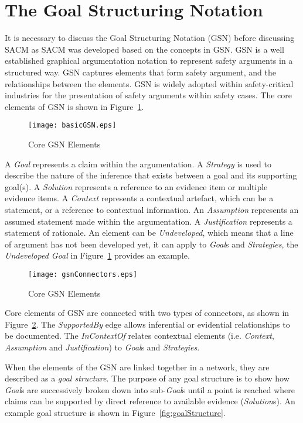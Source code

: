 \section{The Goal Structuring Notation}
\label{gsn}
It is necessary to discuss the Goal Structuring Notation (GSN) before discussing SACM as SACM was developed based on the concepts in GSN. GSN is a well established graphical argumentation notation to represent safety arguments in a structured way. GSN captures elements that form safety argument, and the relationships between the elements. GSN is widely adopted within safety-critical industries for the presentation of safety arguments within safety cases. The core elements of GSN is shown in Figure~\ref{fig:gsnCore}.

\begin{figure}
	\centering
	\texttt{[image: basicGSN.eps]}
	\caption{Core GSN Elements}
	\label{fig:gsnCore}
\end{figure}

A \textit{Goal} represents a claim within the argumentation. A \textit{Strategy} is used to describe the nature of the inference that exists between a goal and its supporting goal(s). A \textit{Solution} represents a reference to an evidence item or multiple evidence items. A \textit{Context} represents a contextual artefact, which can be a statement, or a reference to contextual information. An \textit{Assumption} represents an assumed statement made within the argumentation. A \textit{Justification} represents a statement of rationale. An element can be \textit{Undeveloped}, which means that a line of argument has not been developed yet, it can apply to \textit{Goal}s and \textit{Strategies}, the \textit{Undeveloped Goal} in Figure~\ref{fig:gsnCore} provides an example. 

\begin{figure}
	\centering
	\texttt{[image: gsnConnectors.eps]}
	\caption{Core GSN Elements}
	\label{fig:gsnEdges}
\end{figure}

Core elements of GSN are connected with two types of connectors, as shown in Figure~\ref{fig:gsnEdges}. The \textit{SupportedBy} edge allows inferential or evidential relationships to be documented. The \textit{InContextOf} relates contextual elements (i.e. \textit{Context}, \textit{Assumption} and \textit{Justification}) to \textit{Goal}s and \textit{Strategies}.

When the elements of the GSN are linked together in a network, they are described as a \textit{goal structure}. The purpose of any goal structure is to show how \textit{Goal}s are successively broken down into sub-\textit{Goal}s until a point is reached where claims can be supported by direct reference to available evidence (\textit{Solution}s). An example goal structure is shown in Figure~\ref{fig:goalStructure}.

